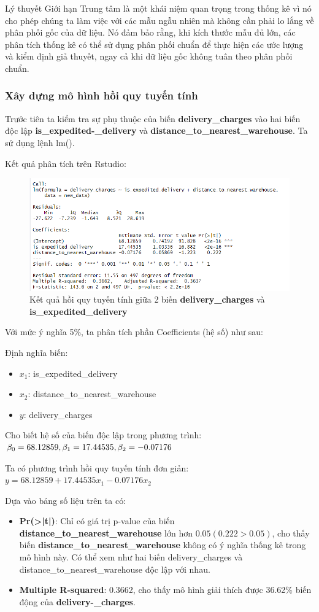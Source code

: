 Lý thuyết Giới hạn Trung tâm là một khái niệm quan trọng trong thống kê vì nó cho phép chúng ta làm việc với các mẫu ngẫu nhiên mà không cần phải lo lắng về phân phối gốc của dữ liệu. Nó đảm bảo rằng, khi kích thước mẫu đủ lớn, các phân tích thống kê có thể sử dụng phân phối chuẩn để thực hiện các ước lượng và kiểm định giả thuyết, ngay cả khi dữ liệu gốc không tuân theo phân phối chuẩn.
\subsubsection{Xây dựng mô hình hồi quy tuyến tính}
Trước tiên ta kiểm tra sự phụ thuộc của biến \textbf{delivery\_charges} vào hai biến độc lập \textbf{is\_expedited-\_delivery} và \textbf{distance\_to\_nearest\_warehouse}. Ta sử dụng lệnh lm().

Kết quả phân tích trên Rstudio:
\begin{figure}[H]
  \centering
  \includegraphics[width=0.7\linewidth]{graphics/5.5.1.png}
  \caption{Kết quả hồi quy tuyến tính giữa 2 biến \textbf{delivery\_charges} và \textbf{is\_expedited\_delivery}  }
\end{figure}


Với mức ý nghĩa 5\%, ta phân tích phần Coefficients (hệ số) như sau:

Định nghĩa biến:
\begin{itemize}
  \item $x_1$: is\_expedited\_delivery
  \item $x_2$: distance\_to\_nearest\_warehouse
  \item $y$: delivery\_charges
\end{itemize}
Cho biết hệ số của biến độc lập trong phương trình: $\beta_0= 68.12859, \beta_1= 17.44535,\\ \beta_2= -0.07176 $
 
Ta có phương trình hồi quy tuyến tính đơn giản: $y= 68.12859 + 17.44535x_1 - 0.07176x_2$

 Dựa vào bảng số liệu trên ta có:

 \begin{itemize}
 \item\textbf{Pr(>|t|)}: Chỉ có giá trị p-value của biến \textbf{distance\_to\_nearest\_warehouse} lớn hơn $0.05(0.222>0.05)$, cho thấy biến \textbf{distance\_to\_nearest\_warehouse} không có ý nghĩa thống kê trong mô hình này. Có thể xem như hai biến delivery\_charges và distance\_to\_nearest\_warehouse độc lập với nhau.
\item\textbf{Multiple R-squared}: 0.3662, cho thấy mô hình giải thích được 36.62\% biến động của \textbf{delivery-\_charges}.
 \end{itemize}

